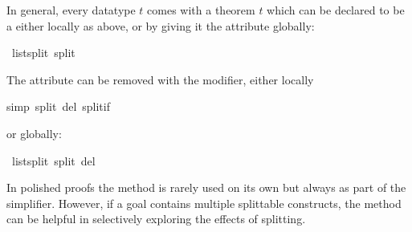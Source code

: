 \begin{isabellebody}
\begin{isamarkuptext}
In general, every datatype $t$ comes with a theorem
$t$ which can be declared to be a  either
locally as above, or by giving it the  attribute globally:%
\end{isamarkuptext}%
\ list{\isachardot}split\ {\isacharbrackleft}split{\isacharbrackright}%
\begin{isamarkuptext}%
\noindent
The  attribute can be removed with the  modifier,
either locally%
\end{isamarkuptext}%
simp\ split\ del{\isacharcolon}\ split{\isacharunderscore}if{\isacharparenright}%
\begin{isamarkuptext}%
\noindent
or globally:%
\end{isamarkuptext}%
\ list{\isachardot}split\ {\isacharbrackleft}split\ del{\isacharbrackright}%
\begin{isamarkuptext}%
In polished proofs the  method is rarely used on its own
but always as part of the simplifier. However, if a goal contains
multiple splittable constructs, the  method can be
helpful in selectively exploring the effects of splitting.


\end{isamarkuptext}
\end{isabellebody}
